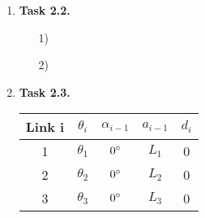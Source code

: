 \documentclass[a4paper,11pt]{article}
\begin{document}
\begin {enumerate}
\begin{enumerate}
        For the second rotation around $x_3$ by $\theta_4$, we append the rotation matrix to the right side of ${^0T_3}$.
        \begin{align*}
        	{^0T_3}'' &= {^0T_3} \cdot Rot_{x_3}(\theta_4)\\
        	&= \begin{bmatrix}
			-1 & 0 & 0 & C_1a_1 - C_{3}a_2 - a_3\\
			0 & -1 & 0 & S_1a_1 + S_{3}a_2\\
			0 & 0 & 1 & 0\\
			0 & 0 & 0 & 1
		\end{bmatrix} \begin{bmatrix}
			1 & 0 & 0 & 0\\
			0 & C_4 & -S_4 & 0\\
			0 & S_4 & C_4 & 0\\
			0 & 0 & 0 & 1
		\end{bmatrix}\\
			&= \begin{bmatrix}
			-1 & 0 & 0 & C_1a_1 - C_{3}a_2 - a_3\\
			0 & -C_4 & S_4 & S_1a_1+S_3a_2\\
			0 & S_4 & C_4 & 0\\
			0 & 0 & 0 & 1
		\end{bmatrix}
        \end{align*}
        
    \end{enumerate}

\item[\textbf{Task 2.2.}]

    \begin{enumerate}
        \item[1)]
        \item[2)]
    \end{enumerate}

\item[\textbf{Task 2.3.}]

	\begin{tabular}{|c|c|c|c|c|}
	\hline 
	Link i & $\theta_i$ & $\alpha_{i-1}$ & $a_{i-1}$ & $d_i$ \\ 
	\hline 
	1 & $\theta_1$ & $0\degree$ & $L_1$ & 0 \\ 
	\hline 
	2 & $\theta_2$ & $0\degree$ & $L_2$ & 0 \\ 
	\hline 
	3 & $\theta_3$ & $0\degree$ & $L_3$ & 0 \\
	\hline 
	\end{tabular} 
    

\end{enumerate}
\end{document}
